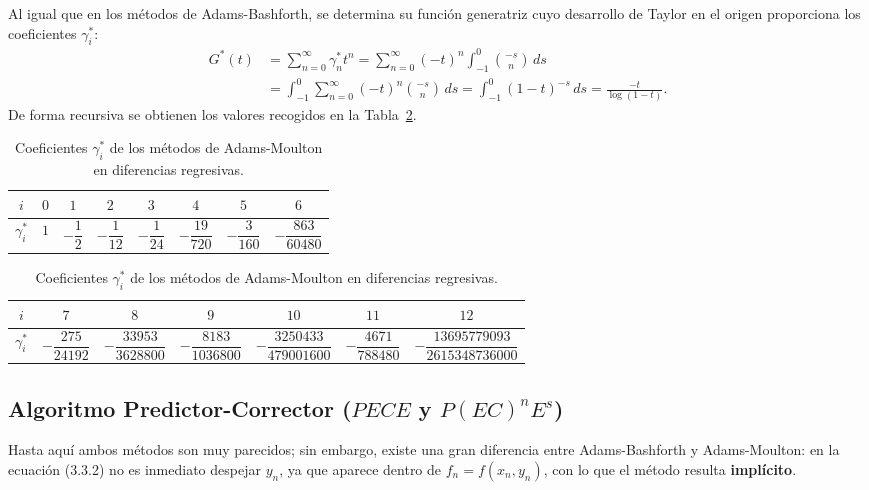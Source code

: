 Al igual que en los métodos de Adams-Bashforth, se determina su función generatriz cuyo desarrollo de Taylor en el origen proporciona los coeficientes $\gamma_i^*$:
\begin{align*}
    G^*(t) &= \sum_{n=0}^{\infty} \gamma_n^* t^n = \sum_{n=0}^{\infty} (-t)^n \int_{-1}^{0} \binom{-s}{n}\,ds \nonumber \\
           &= \int_{-1}^{0} \sum_{n=0}^{\infty} (-t)^n \binom{-s}{n}\,ds = \int_{-1}^{0} (1-t)^{-s}\,ds = \frac{-t}{\log(1-t)}.
\end{align*}
De forma recursiva se obtienen los valores recogidos en la Tabla~\ref{tab:gamma_am}.

\begin{table}[htbp]
    \centering
    \caption{Coeficientes $\gamma_i^*$ de los métodos de Adams-Moulton en diferencias regresivas.}
    \label{tab:gamma_am}
    \renewcommand{\arraystretch}{1.45}
    \small
    \begin{tabular}{cccccccc}
        \toprule
        $i$ & $0$ & $1$ & $2$ & $3$ & $4$ & $5$ & $6$ \\
        \midrule
        $\gamma_i^*$ & $1$ & $-\dfrac{1}{2}$ & $-\dfrac{1}{12}$ & $-\dfrac{1}{24}$ & $-\dfrac{19}{720}$ & $-\dfrac{3}{160}$ & $-\dfrac{863}{60480}$ \\
        \bottomrule
    \end{tabular}

    \vspace{0.35cm}

    \begin{tabular}{ccccccc}
        \toprule
        $i$ & $7$ & $8$ & $9$ & $10$ & $11$ & $12$ \\
        \midrule
        $\gamma_i^*$ & $-\dfrac{275}{24192}$ & $-\dfrac{33953}{3628800}$ & $-\dfrac{8183}{1036800}$ & $-\dfrac{3250433}{479001600}$ & $-\dfrac{4671}{788480}$ & $-\dfrac{13695779093}{2615348736000}$ \\
        \bottomrule
    \end{tabular}
\end{table}

\subsection*{Algoritmo Predictor-Corrector ($PECE$ y $P(EC)^n E^s$)}

Hasta aquí ambos métodos son muy parecidos; sin embargo, existe una gran diferencia entre Adams-Bashforth y Adams-Moulton: en la ecuación (3.3.2) no es inmediato despejar $y_n$, ya que aparece dentro de $f_n = f(x_n, y_n)$, con lo que el método resulta \textbf{implícito}.

